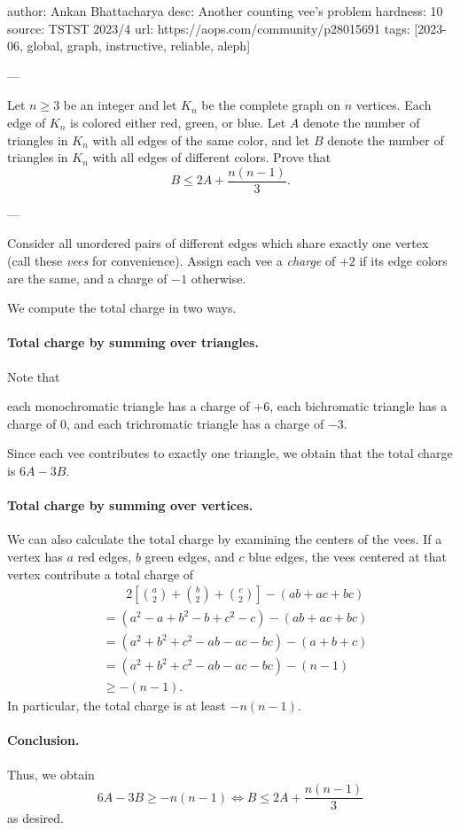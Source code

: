 author: Ankan Bhattacharya
desc: Another counting vee's problem
hardness: 10
source: TSTST 2023/4
url: https://aops.com/community/p28015691
tags: [2023-06, global, graph, instructive, reliable, aleph]

---

Let $n \ge 3$ be an integer and let $K_n$ be the complete graph on $n$ vertices.
Each edge of $K_n$ is colored either red, green, or blue.
Let $A$ denote the number of triangles in $K_n$
with all edges of the same color, and
let $B$ denote the number of triangles in $K_n$
with all edges of different colors.
Prove that
\[ B \le 2A + \frac{n(n-1)}3. \]

---

Consider all unordered pairs of different edges which share exactly one vertex
(call these \emph{vees} for convenience).
Assign each vee a \emph{charge} of $+2$ if its edge colors are the same,
and a charge of $-1$ otherwise.

We compute the total charge in two ways.

\paragraph{Total charge by summing over triangles.}
Note that
\begin{itemize}
  \ii each monochromatic triangle has a charge of $+6$,
  \ii each bichromatic triangle has a charge of $0$, and
  \ii each trichromatic triangle has a charge of $-3$.
\end{itemize}
Since each vee contributes to exactly one triangle,
we obtain that the total charge is $6A - 3B$.

\paragraph{Total charge by summing over vertices.}
We can also calculate the total charge by examining the centers of the vees.
If a vertex has $a$ red edges, $b$ green edges, and $c$ blue edges,
the vees centered at that vertex contribute a total charge of
\begin{align*}
  & \phantom{=}\;\; 2\left[ \binom a2 + \binom b2 + \binom c2\right] - (ab + ac + bc)\\
  & = (a^2 - a + b^2 - b + c^2 - c) - (ab + ac + bc)\\
  & = (a^2 + b^2 + c^2 - ab - ac - bc) - (a + b + c)\\
  & = (a^2 + b^2 + c^2 - ab - ac - bc) - (n-1)\\
  & \ge -(n-1).
\end{align*}
In particular, the total charge is at least $-n(n-1)$.

\paragraph{Conclusion.}
Thus, we obtain
\[
  6A - 3B \ge -n(n-1)
  \iff B \le 2A + \frac{n(n-1)}3
\]
as desired.
